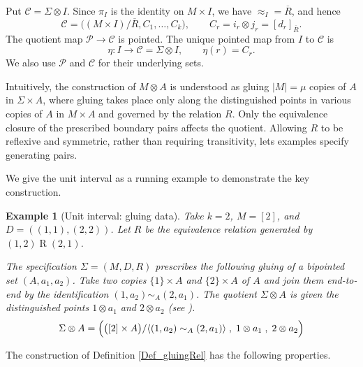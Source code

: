 \documentclass{sn-jnl}%
\theoremstyle{thmstyleone}%
\theoremstyle{thmstyletwo}%
\newtheorem{example}{Example}%
\theoremstyle{thmstylethree}%
\newcommand{\M}{\Sigma}
\newcommand{\F}{\M\otimes}
\newcommand{\s}{\mu}
\newcommand{\gPoints}{\pi}
\begin{document}
Put $\mathcal C=\F I$. Since $\gPoints_I$ is the identity on $M\times I$, we have $\approx_I=\overline R$, and hence
\begin{equation}
\nonumber
    \mathcal C=\bigl((M\times I)/\overline R,C_1,\ldots,C_k\bigr),
    \qquad C_r=i_r\otimes j_r=[d_r]_{\overline R}.
\end{equation}
The quotient map $\mathcal P\to\mathcal C$ is pointed. The unique pointed map from $I$ to $\mathcal C$ is
\begin{equation}
\nonumber
    \eta:I\longrightarrow\mathcal C=\F I,\qquad \eta(r)=C_r.
\end{equation}
We also use $\mathcal P$ and $\mathcal C$ for their underlying sets.

Intuitively, the construction of $M\otimes A$ is understood as gluing $|M|=\s$ copies of $A$ in $\M \times A$, where gluing takes place only along the distinguished points in various copies of $A$ in $M\times A$ and governed by the relation $R$. Only the equivalence closure of the prescribed boundary pairs affects the quotient. Allowing $R$ to be reflexive and symmetric, rather than requiring transitivity, lets examples specify generating pairs. 

We give the unit interval as a running example to demonstrate the key construction.
\begin{example}[Unit interval: gluing data]
\label{Ex_unitInterval}
    Take $k=2$, $M=[2]$, and $D=((1,1),(2,2))$. Let $R$ be the equivalence relation generated by $(1,2)\mathrel{R}(2,1)$. 
    
    The specification $\Sigma = (M, D, R)$ prescribes the following gluing of a bipointed set $(A,a_1,a_2)$. Take two copies $\{1\} \times A$ and $\{2\} \times A$ of $A$ and join them end-to-end by the identification $(1,a_2)\sim_A (2,a_1)$. The quotient $\F A$ is given the distinguished points $1\otimes a_1$ and $2\otimes a_2$ (see \cite{freyd:real,Bhat}).
    \begin{equation}
    \nonumber
        \F A = \Bigl( \bigl( [2] \times A \bigr)/\langle(1,a_2)\sim_A (2,a_1)\rangle\;,\; 1\otimes a_1\;,\;2\otimes a_2 \Bigr)
    \end{equation}
\end{example}
    
The construction of Definition \ref{Def_gluingRel} has the following  properties.
\end{document}
